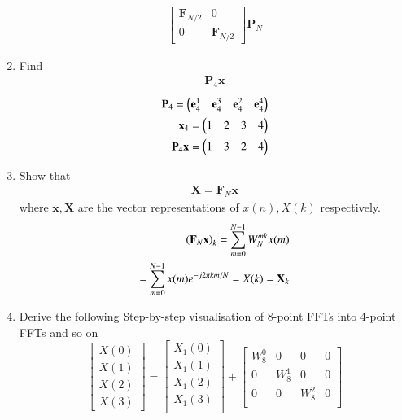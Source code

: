 \documentclass[journal,12pt,twocolumn]{IEEEtran}
\let\vec\mathbf
\renewcommand\thesection{\arabic{section}}
\begin{document}
\begin{enumerate}[label=\arabic*.,ref=\thesection.\theenumi]
\begin{align}
		\begin{bmatrix}
			\vec{F}_{N/2} & 0 \\
			0 & \vec{F}_{N/2}
		\end{bmatrix}
		\vec{P}_{N}
	\end{align}
	\item Find 
	\begin{align}
		\vec{P}_4 \vec{x}
	\end{align}
	\solution
	\begin{align}
		\vec{P}_{4} = \myvec{\vec{e}_4^{1} &\vec{e}_4^{3} &\vec{e}_4^{2}	&\vec{e}_4^{4}}\\
		\vec{x}_4 = \myvec{1 & 2 & 3 & 4}\\%
		\vec{P}_{4}	\vec{x} = \myvec{1 & 3 & 2 & 4}
	\end{align}
	\item Show that 
	\begin{align}
		\vec{X} = \vec{F}_N \vec{x}
		\label{eq:dft-mat-def}
	\end{align}
	where $\vec{x}, \vec{X}$ are the vector representations of $x(n), X(k)$ respectively.\\
	\solution
	\begin{align}
		\brak{\vec{F}_{N}\vec{x}}_{k} = \sum_{m=0}^{N-1}W_{N}^{mk}x(m)\\
		= \sum_{m=0}^{N-1} x(m) e^{-j 2 \pi k m / N}
		= X(k) = \vec{X}_{k} 
	\end{align}
	\item Derive the following Step-by-step visualisation  of
	8-point FFTs into 4-point FFTs and so on
	\begin{equation}
		\begin{bmatrix}
			X(0) \\ 
			X(1) \\ 
			X(2) \\ 
			X(3)
		\end{bmatrix}
		=
		\begin{bmatrix}
			X_{1}(0) \\ 
			X_{1}(1)\\ 
			X_{1}(2)\\
			X_{1}(3)\\
		\end{bmatrix}
		+
		\begin{bmatrix}
			W^{0}_{8} & 0 & 0 & 0\\
			0 & W^{1}_{8} & 0 & 0\\
			0 & 0 & W^{2}_{8} & 0\\

\end{bmatrix}
\end{equation}
\end{enumerate}
\end{document}
